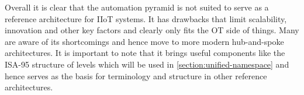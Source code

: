     Overall it is clear that the automation pyramid is not suited to serve as a reference architecture for IIoT systems. It has drawbacks that limit scalability, innovation and other key factors and clearly only fits the OT side of things. Many are aware of its shortcomings and hence move to more modern hub-and-spoke architectures. It is important to note that it brings useful components like the ISA-95 structure of levels which will be used in \autoref{section:unified-namespace} and hence serves as the basis for terminology and structure in other reference architectures.
